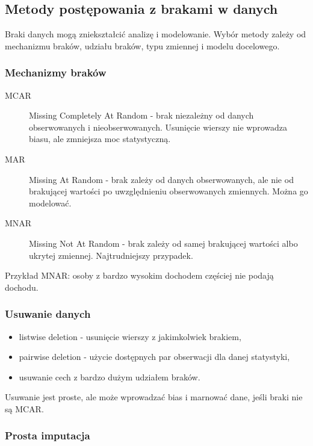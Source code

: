 \subsection{Metody postępowania z brakami w danych}

Braki danych mogą zniekształcić analizę i modelowanie. Wybór metody zależy od mechanizmu braków, udziału braków, typu zmiennej i modelu docelowego.

\subsubsection{Mechanizmy braków}

\begin{description}
  \item[MCAR] Missing Completely At Random - brak niezależny od danych obserwowanych i nieobserwowanych. Usunięcie wierszy nie wprowadza biasu, ale zmniejsza moc statystyczną.
  \item[MAR] Missing At Random - brak zależy od danych obserwowanych, ale nie od brakującej wartości po uwzględnieniu obserwowanych zmiennych. Można go modelować.
  \item[MNAR] Missing Not At Random - brak zależy od samej brakującej wartości albo ukrytej zmiennej. Najtrudniejszy przypadek.
\end{description}

Przykład MNAR: osoby z bardzo wysokim dochodem częściej nie podają dochodu.

\subsubsection{Usuwanie danych}

\begin{itemize}
  \item listwise deletion - usunięcie wierszy z jakimkolwiek brakiem,
  \item pairwise deletion - użycie dostępnych par obserwacji dla danej statystyki,
  \item usuwanie cech z bardzo dużym udziałem braków.
\end{itemize}

Usuwanie jest proste, ale może wprowadzać bias i marnować dane, jeśli braki nie są MCAR.

\subsubsection{Prosta imputacja}

